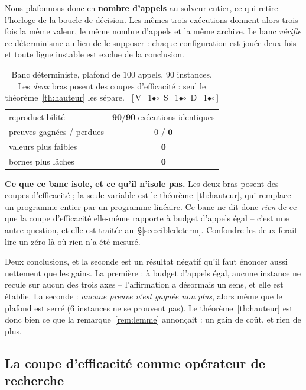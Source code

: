 \documentclass[11pt,a4paper]{article}
\theoremstyle{plain}
\theoremstyle{remark}
\newcommand{\cfgm}[1]{\ifnum#1=1$\bullet$\else$\circ$\fi}
\newcommand{\conf}[3]{%
  \textsf{\footnotesize[\,V\cfgm{#1}\ S\cfgm{#2}\ D\cfgm{#3}\,]}}
\begin{document}
Nous plafonnons donc en \textbf{nombre d'appels} au solveur entier, ce qui
retire l'horloge de la boucle de décision. Les mêmes trois exécutions
donnent alors trois fois la même valeur, le même nombre d'appels et la même
archive. Le banc \emph{vérifie} ce déterminisme au lieu de le supposer :
chaque configuration est jouée deux fois et toute ligne instable est exclue
de la conclusion.

\begin{table}[H]
\centering
\caption{Banc déterministe, plafond de $100$ appels, $90$ instances. Les
\emph{deux} bras posent des coupes d'efficacité : seul le
théorème~\ref{th:hauteur} les sépare.\ \conf{0}{0}{0}}
\label{tab:determ}
\begin{tabular}{lc}
\toprule
reproductibilité & $\mathbf{90/90}$ exécutions identiques\\
preuves gagnées / perdues & $0$ / $\mathbf{0}$\\
valeurs plus faibles & $\mathbf{0}$\\
bornes plus lâches & $\mathbf{0}$\\
\bottomrule
\end{tabular}
\end{table}

\noindent
\textbf{Ce que ce banc isole, et ce qu'il n'isole pas.} Les deux bras posent
des coupes d'efficacité ; la seule variable est le
théorème~\ref{th:hauteur}, qui remplace un programme entier par un programme
linéaire. Ce banc ne dit donc \emph{rien} de ce que la coupe d'efficacité
elle-même rapporte à budget d'appels égal -- c'est une autre question, et
elle est traitée au~§\ref{sec:cibledeterm}. Confondre les deux ferait lire
un zéro là où rien n'a été mesuré.

Deux conclusions, et la seconde est un résultat négatif qu'il faut énoncer
aussi nettement que les gains. La première : à budget d'appels égal, aucune
instance ne recule sur aucun des trois axes -- l'affirmation a désormais un
sens, et elle est établie. La seconde : \emph{aucune preuve n'est gagnée non
plus}, alors même que le plafond est serré ($6$ instances ne se prouvent
pas). Le théorème~\ref{th:hauteur} est donc bien ce que la
remarque~\ref{rem:lemme} annonçait : un gain de coût, et rien de plus.

\subsection{La coupe d'efficacité comme opérateur de recherche}
\label{sec:divers}
\end{document}
